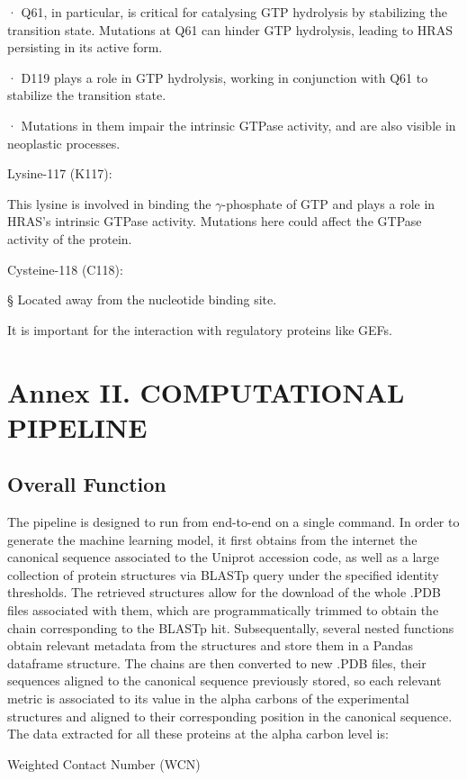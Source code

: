 \documentclass{article}
\begin{document}
· Q61, in particular, is critical for catalysing GTP hydrolysis by stabilizing the transition state. Mutations at Q61 can hinder GTP hydrolysis, leading to HRAS persisting in its active form.

· D119 plays a role in GTP hydrolysis, working in conjunction with Q61 to stabilize the transition state.

· Mutations in them impair the intrinsic GTPase activity, and are also visible in neoplastic processes.

Lysine-117 (K117):

This lysine is involved in binding the $\gamma$-phosphate of GTP and plays a role in HRAS's intrinsic GTPase activity. Mutations here could affect the GTPase activity of the protein.

Cysteine-118 (C118):

§ Located away from the nucleotide binding site.

It is important for the interaction with regulatory proteins like GEFs.

\section{Annex II. COMPUTATIONAL PIPELINE}

\subsection{Overall Function}

The pipeline is designed to run from end-to-end on a single command. In order to generate the machine learning model, it first obtains from the internet the canonical sequence associated to the Uniprot accession code, as well as a large collection of protein structures via BLASTp query under the specified identity thresholds. The retrieved structures allow for the download of the whole .PDB files associated with them, which are programmatically trimmed to obtain the chain corresponding to the BLASTp hit. Subsequentally, several nested functions obtain relevant metadata from the structures and store them in a Pandas dataframe structure. The chains are then converted to new .PDB files, their sequences aligned to the canonical sequence previously stored, so each relevant metric is associated to its value in the alpha carbons of the experimental structures and aligned to their corresponding position in the canonical sequence. The data extracted for all these proteins at the alpha carbon level is:

Weighted Contact Number (WCN)
\end{document}
